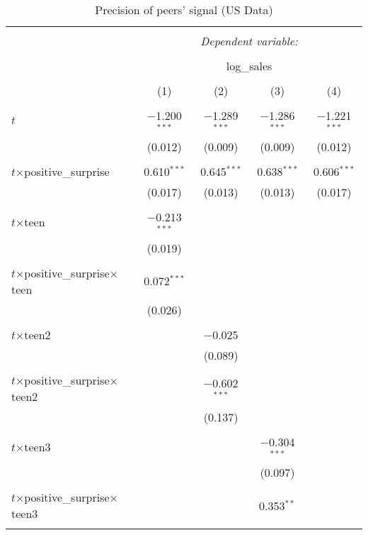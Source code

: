 \begin{table}[!htbp] \centering 
	\caption{Precision of peers' signal (US Data)} 
  \label{uspred3} 
\begin{tabular}{@{\extracolsep{5pt}}lcccc} 
\\[-1.8ex]\hline 
\hline \\[-1.8ex] 
 & \multicolumn{4}{c}{\textit{Dependent variable:}} \\ 
\cline{2-5} 
\\[-1.8ex] & \multicolumn{4}{c}{log\_sales} \\ 
\\[-1.8ex] & (1) & (2) & (3) & (4)\\ 
\hline \\[-1.8ex] 
 $t$ & $-$1.200$^{***}$ & $-$1.289$^{***}$ & $-$1.286$^{***}$ & $-$1.221$^{***}$ \\ 
  & (0.012) & (0.009) & (0.009) & (0.012) \\ 
  & & & & \\ 
 $t$$\times$positive\_surprise & 0.610$^{***}$ & 0.645$^{***}$ & 0.638$^{***}$ & 0.606$^{***}$ \\ 
  & (0.017) & (0.013) & (0.013) & (0.017) \\ 
  & & & & \\ 
 $t$$\times$teen & $-$0.213$^{***}$ &  &  &  \\ 
  & (0.019) &  &  &  \\ 
  & & & & \\ 
 $t$$\times$positive\_surprise$\times$teen & 0.072$^{***}$ &  &  &  \\ 
  & (0.026) &  &  &  \\ 
  & & & & \\ 
 $t$$\times$teen2 &  & $-$0.025 &  &  \\ 
  &  & (0.089) &  &  \\ 
  & & & & \\ 
 $t$$\times$positive\_surprise$\times$teen2 &  & $-$0.602$^{***}$ &  &  \\ 
  &  & (0.137) &  &  \\ 
  & & & & \\ 
 $t$$\times$teen3 &  &  & $-$0.304$^{***}$ &  \\ 
  &  &  & (0.097) &  \\ 
  & & & & \\ 
 $t$$\times$positive\_surprise$\times$teen3 &  &  & 0.353$^{**}$ &  \\ 
$$
\end{tabular}
\end{table}
